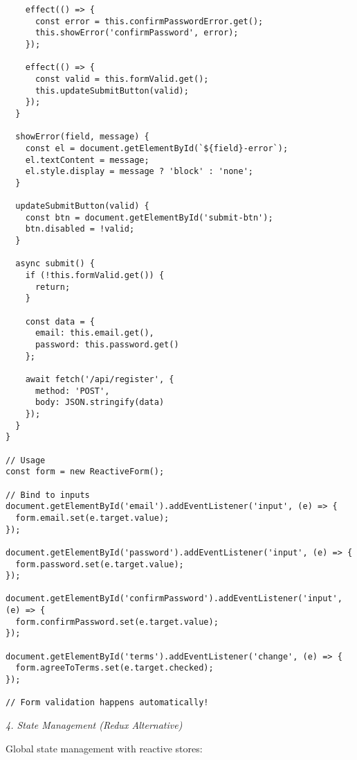 \documentclass[11pt]{article}
\begin{document}
\begin{verbatim}
    effect(() => {
      const error = this.confirmPasswordError.get();
      this.showError('confirmPassword', error);
    });
    
    effect(() => {
      const valid = this.formValid.get();
      this.updateSubmitButton(valid);
    });
  }
  
  showError(field, message) {
    const el = document.getElementById(`${field}-error`);
    el.textContent = message;
    el.style.display = message ? 'block' : 'none';
  }
  
  updateSubmitButton(valid) {
    const btn = document.getElementById('submit-btn');
    btn.disabled = !valid;
  }
  
  async submit() {
    if (!this.formValid.get()) {
      return;
    }
    
    const data = {
      email: this.email.get(),
      password: this.password.get()
    };
    
    await fetch('/api/register', {
      method: 'POST',
      body: JSON.stringify(data)
    });
  }
}

// Usage
const form = new ReactiveForm();

// Bind to inputs
document.getElementById('email').addEventListener('input', (e) => {
  form.email.set(e.target.value);
});

document.getElementById('password').addEventListener('input', (e) => {
  form.password.set(e.target.value);
});

document.getElementById('confirmPassword').addEventListener('input', (e) => {
  form.confirmPassword.set(e.target.value);
});

document.getElementById('terms').addEventListener('change', (e) => {
  form.agreeToTerms.set(e.target.checked);
});

// Form validation happens automatically!
\end{verbatim}

\emph{4. State Management (Redux Alternative)}

Global state management with reactive stores:
\end{document}
